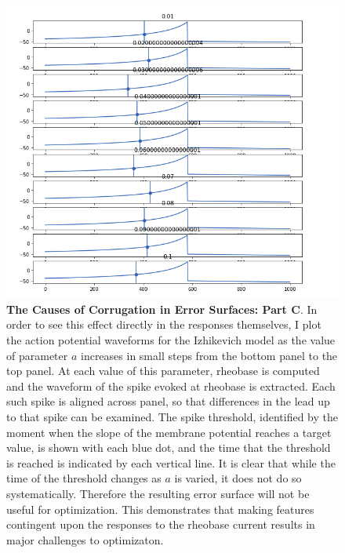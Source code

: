 \begin{figure}
\begin{center}
\includegraphics[]{figures/variable_vt.png}
\caption[Causes of corrugation (3)]{\textbf{The Causes of Corrugation in Error Surfaces: Part C}.
In order to see this effect directly in the responses themselves, I plot the action potential waveforms for the Izhikevich model as the value of parameter $a$ increases in small steps from the bottom panel to the top panel.
At each value of this parameter, rheobase is computed and the waveform of the spike evoked at rheobase is extracted.
Each such spike is aligned across panel, so that differences in the lead up to that spike can be examined.
The spike threshold, identified by the moment when the slope of the membrane potential reaches a target value, is shown with each blue dot, and the time that the threshold is reached is indicated by each vertical line.
It is clear that while the time of the threshold changes as $a$ is varied, it does not do so systematically.
Therefore the resulting error surface will not be useful for optimization.
This demonstrates that making features contingent upon the responses to the rheobase current results in major challenges to optimizaton.}
\label{fig:variable-vt}
\end{center}
\end{figure}


